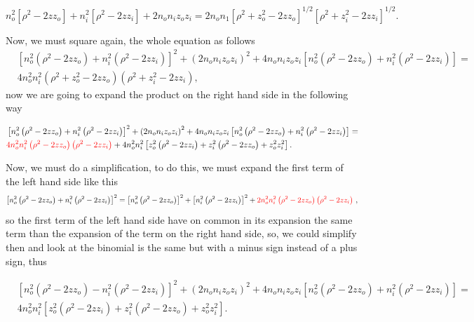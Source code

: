        \begin{equation}
            n_o^2\left[ \rho^2 - 2zz_o \right] + n_i^2\left[ \rho^2 - 2zz_i \right] + 2n_on_iz_oz_i = 2n_on_1 \left[ \rho^2 + z_o^2 -2zz_o \right]^{1/2}\left[\rho^2 + z_i^2 - 2zz_i\right]^{1/2}.
        \end{equation}

        Now, we must square again, the whole equation as follows
        \begin{align*}
            & \left[ n_o^2\left( \rho^2 -2zz_o \right) + n_i^2\left( \rho^2-2zz_i \right) \right]^2 +\left( 2n_on_iz_oz_i \right)^2 + 4n_on_iz_oz_i \left[ n_o^2\left( \rho^2-2zz_o \right) + n_i^2\left( \rho^2 - 2zz_i \right) \right] = \\
            & 4n_o^2n_i^2\left( \rho^2 + z_o^2 - 2zz_o \right)\left( \rho^2 + z_i^2 - 2zz_i \right),
        \end{align*}
        now we are going to expand the product on the right hand side in the following way

        \begin{align*}
            & \left[ n_o^2\left( \rho^2 -2zz_o \right) + n_i^2\left( \rho^2-2zz_i \right) \right]^2 +\left( 2n_on_iz_oz_i \right)^2 + 4n_on_iz_oz_i \left[ n_o^2\left( \rho^2-2zz_o \right) + n_i^2\left( \rho^2 - 2zz_i \right) \right] = \\
            & \text{\color{red} $4n_o^2n_i^2\left( \rho^2 - 2zz_o \right)\left( \rho^2 - 2zz_i \right)$} + 4n_o^2n_i^2 \left[ z_o^2 \left( \rho^2 - 2zz_i \right) + z_i^2\left( \rho^2-2zz_o \right)  +z_o^2z_i^2 \right].
        \end{align*}

        Now, we must do a simplification, to do this, we must expand the first term of the left hand side like this
        \begin{equation*}
            \left[ n_o^2\left( \rho^2 -2zz_o \right) + n_i^2\left( \rho^2-2zz_i \right) \right]^2 = \left[ n_o^2\left( \rho^2-2zz_o \right)\right]^2 + \left[ n_i^2\left( \rho^2-2zz_i \right)\right]^2 + \text{\color{red} $ 2n_o^2n_i^2\left( \rho^2 -2zz_o \right)\left( \rho^2 -2zz_i \right) $ },
        \end{equation*}
        so the first term of the left hand side have on common in its expansion the same term than the expansion of the term on the right hand side, so, we could simplify then and look at the binomial is the same but with a minus sign instead of a plus sign, thus

        \begin{align*}
            & \left[ n_o^2\left( \rho^2 -2zz_o \right) - n_i^2\left( \rho^2-2zz_i \right) \right]^2 +\left( 2n_on_iz_oz_i \right)^2 + 4n_on_iz_oz_i \left[ n_o^2\left( \rho^2-2zz_o \right) + n_i^2\left( \rho^2 - 2zz_i \right) \right] = \\
            & 4n_o^2n_i^2 \left[ z_o^2 \left( \rho^2 - 2zz_i \right) + z_i^2\left( \rho^2-2zz_o \right)  +z_o^2z_i^2 \right].
        \end{align*}


